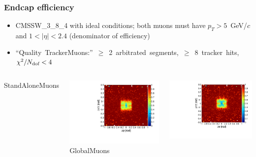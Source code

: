 \documentclass[compress]{beamer}
\newcommand{\s}[1]{{\mbox{\scriptsize #1}}}
\begin{document}
\begin{frame}
\frametitle{Endcap efficiency}
\begin{itemize}
\item CMSSW\_3\_8\_4 with ideal conditions; both muons must have $p_T > 5$~GeV/$c$ and $1 < |\eta| < 2.4$ (denominator of efficiency)

\item \mbox{\scriptsize ``Quality TrackerMuons:'' $\ge$ 2 arbitrated segments, $\ge$ 8 tracker hits, $\chi^2/N_\s{dof} < 4$\hspace{-1 cm}}
\end{itemize}

\begin{columns}
\centering StandAloneMuons

\includegraphics[width=\linewidth]{endcap_dphidr_StandAloneMuon.pdf}
\centering GlobalMuons

\includegraphics[width=\linewidth]{endcap_dphidr_GlobalMuon.pdf}


\end{columns}
\end{frame}
\end{document}
